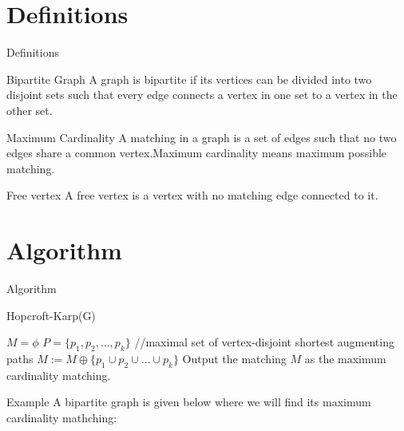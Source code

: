 \documentclass{beamer}
\begin{document}
\section{Definitions}
\begin{frame}{Definitions}
     \begin{block}{Bipartite Graph}
A graph is bipartite if its vertices can be divided into two disjoint sets such that every edge connects a vertex in one set to a vertex in the other set.
\end{block}
 \pause
\begin{block}{Maximum Cardinality}
A matching in a graph is a set of edges such that no two edges share a common vertex.Maximum cardinality means maximum possible matching.
\end{block} \pause
\begin{block}{Free vertex}
 A free vertex is a vertex with no matching edge connected to it.
\end{block}


\end{frame}

\section{Algorithm}
\begin{frame}{Algorithm}
\renewcommand{\thealgorithm}{}
\begin{algorithm}[H]
\caption{Hopcroft-Karp(G)}
\begin{algorithmic}[1]
\State $M=\phi$ \pause
\Repeat 
\State $P=\{p_1,p_2,\dots,p_k\}$ {\tiny //maximal set of vertex-disjoint shortest augmenting paths} \pause
\State $M:=M\oplus\{p_1 \cup p_2 \cup \dots \cup p_k\}$\pause
{} \pause
\State Output the matching $M$ as the maximum cardinality matching.
\end{algorithmic}
\end{algorithm}
\end{frame}

\begin{frame}{Example}
A bipartite graph is given below where we will find its maximum cardinality mathching:\\
 \vspace{.5cm}
    \centering
{}
\end{frame}
\end{document}
